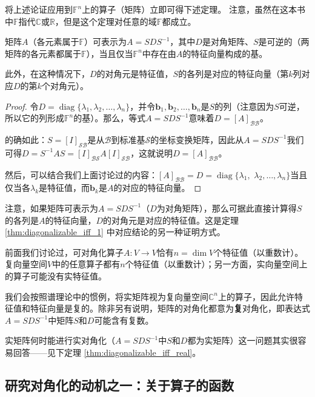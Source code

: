 将上述论证应用到$\mathbb{F}^n$上的算子（矩阵）立即可得下述定理。
注意，虽然在这本书中$\mathbb{F}$指代$\mathbb{C}$或$\mathbb{R}$，但是这个定理对任意的域$\mathbb{F}$都成立。

\begin{theorem}\label{thm:diagonalizable_iff_1}
    矩阵$A$（各元素属于$\mathbb{F}$）可表示为$A=SDS^{-1}$，其中$D$是对角矩阵、$S$是可逆的（两矩阵的各元素都属于$\mathbb{F}$），当且仅当$\mathbb{F}^n$中存在由$A$的特征向量构成的基。

    此外，在这种情况下，$D$的对角元是特征值，$S$的各列是对应的特征向量（第$k$列对应$D$的第$k$个对角元）。
\end{theorem}
\begin{proof}
    令$D=\operatorname{diag}\{\lambda_1,\lambda_2,\dots,\lambda_n\}$，并令$\mathbf{b}_{1},\mathbf{b}_{2},\ldots,\mathbf{b}_{n}$是$S$的列（注意因为$S$可逆，所以它的列形成$\mathbb{F}^n$的基）。那么，等式$A=SDS^{-1}$意味着$D=[A]_\mathcal{BB}$。

    的确如此：$S=[I]_\mathcal{SB}$是从$\mathcal{B}$到标准基$\mathcal{S}$的坐标变换矩阵，因此从$A=SDS^{-1}$我们可得$D=S^{-1}AS=[I]_\mathcal{BS}A[I]_\mathcal{SB}$，这就说明$D=[A]_\mathcal{BB}$。

    然后，可以结合我们上面讨论过的内容：$[A]_\mathcal{BB}=D=\operatorname{diag}\{\lambda_1,$ $\lambda_2,\ldots,\lambda_n\}$当且仅当各$\lambda_k$是特征值，而$\mathbf{b}_k$是$A$的对应的特征向量。
\end{proof}

\begin{remark*}
    注意，如果矩阵可表示为$A=SDS^{-1}$（$D$为对角矩阵），那么可据此直接计算得$S$的各列是$A$的特征向量，$D$的对角元是对应的特征值。这是定理 \ref{thm:diagonalizable_iff_1} 中对应结论的另一种证明方式。
\end{remark*}

前面我们讨论过，可对角化算子$A:V\to V$恰有$n=\dim V$个特征值（以重数计）。复向量空间$V$中的任意算子都有$n$个特征值（以重数计）；另一方面，实向量空间上的算子可能没有实特征值。

我们会按照谱理论中的惯例，将实矩阵视为复向量空间$\mathbb{C}^n$上的算子，因此允许特征值和特征向量是复的。除非另有说明，矩阵的对角化都意为\textbf{复}对角化，即表达式$A=SDS^{-1}$中矩阵$S$和$D$可能含有复数。

实矩阵何时能进行实对角化（$A=SDS^{-1}$中$S$和$D$都为实矩阵）这一问题其实很容易回答——见下定理 \ref{thm:diagonalizable_iff_real}。

\subsection{研究对角化的动机之一：关于算子的函数}

